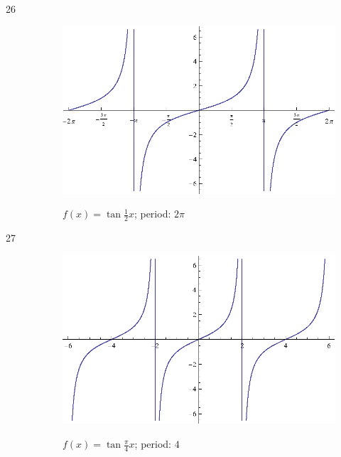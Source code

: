\documentclass{exam}
\begin{document}
\begin{description}
      \item[26]
        \begin{figure}[H]
          \centering
          \includegraphics[scale=0.9]{exercise26.eps}

          $f(x) = \tan \frac{1}{2} x $; period: $2 \pi$
        \end{figure}

      \item[27]
        \begin{figure}[H]
          \centering
          \includegraphics[scale=0.9]{exercise27.eps}

          $f(x) = \tan \frac{\pi}{4} x $; period: $4$
        \end{figure}


\end{description}
\end{document}
